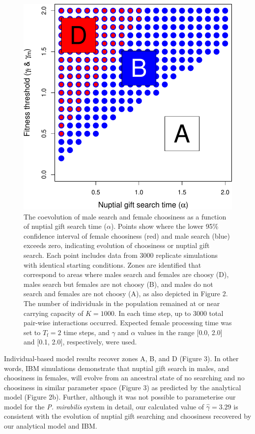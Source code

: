 \documentclass[
]{article}
\begin{document}
\begin{figure}
\centering
\includegraphics{index_files/figure-latex/unnamed-chunk-4-1.pdf}
\caption{The coevolution of male search and female choosiness as a
function of nuptial gift search time (\(\alpha\)). Points show where the
lower 95\% confidence interval of female choosiness (red) and male
search (blue) exceeds zero, indicating evolution of choosiness or
nuptial gift search. Each point includes data from 3000 replicate
simulations with identical starting conditions. Zones are identified
that correspond to areas where males search and females are choosy (D),
males search but females are not choosy (B), and males do not search and
females are not choosy (A), as also depicted in Figure 2. The number of
individuals in the population remained at or near carrying capacity of
\(K = 1000\). In each time step, up to 3000 total pair-wise interactions
occurred. Expected female processing time was set to
\(T_{\mathrm{f}}=2\) time steps, and \(\gamma\) and \(\alpha\) values in
the range {[}0.0, 2.0{]} and {[}0.1, 2.0{]}, respectively, were used.}
\end{figure}

Individual-based model results recover zones A, B, and D (Figure 3). In
other words, IBM simulations demonstrate that nuptial gift search in
males, and choosiness in females, will evolve from an ancestral state of
no searching and no choosiness in similar parameter space (Figure 3) as
predicted by the analytical model (Figure 2b). Further, although it was
not possible to parameterise our model for the \emph{P. mirabilis}
system in detail, our calculated value of \(\hat{\gamma} = 3.29\) is
consistent with the evolution of nuptial gift searching and choosiness
recovered by our analytical model and IBM.
\end{document}
